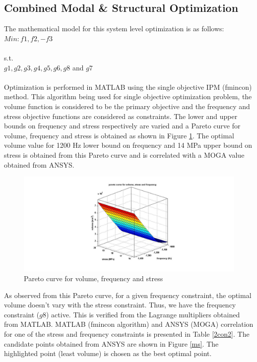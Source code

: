 \documentclass[12pt]{article}
\begin{document}
\subsection{Combined Modal \& Structural Optimization}
The mathematical model for this system level optimization is as follows:\newline\newline
$Min: f1, f2, -f3$\\\\
s.t.\\  $g1, g2, g3, g4, g5, g6, g8$ and $g7$\\\\
Optimization is performed in MATLAB using the single objective IPM (fmincon) method. This algorithm being used for single objective optimization problem, the volume function is considered to be the primary objective and the frequency and stress objective functions are considered as constraints. The lower and upper bounds on frequency and stress respectively are varied and a Pareto curve for volume, frequency and stress is obtained as shown in Figure \ref{pareto2}. The optimal volume value for 1200 Hz lower bound on frequency and 14 MPa upper bound on stress is obtained from this Pareto curve and is correlated with a MOGA value obtained from ANSYS.
\begin{figure}
\begin{center}
\includegraphics[width=1\textwidth]{stress_freq_pareto.jpg}
\caption{Pareto curve for volume, frequency and stress}
\label{pareto2}
\end{center}
\end{figure}
As observed from this Pareto curve, for a given frequency constraint, the optimal volume doesn't vary with the stress constraint. Thus, we have the frequency constraint ($g8$) active. This is verified from the Lagrange multipliers obtained from MATLAB. MATLAB (fmincon algorithm) and ANSYS (MOGA) correlation for one of the stress and frequency constraints is presented in Table \ref{2con2}. The candidate points obtained from ANSYS are shown in Figure \ref{ms}. The highlighted point (least volume) is chosen as the best optimal point.
\end{document}
